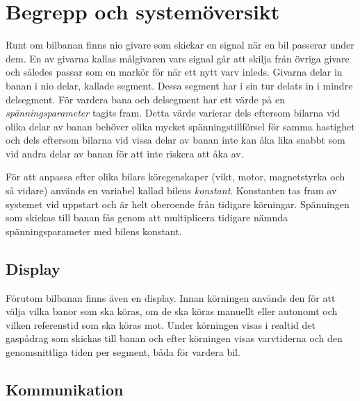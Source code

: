 \section{Begrepp och systemöversikt}
\label{sec:begrepp och systemöversikt}

Runt om bilbanan finns nio givare som skickar en signal när en bil passerar
under dem. En av givarna kallas målgivaren vars signal går att skilja från
övriga givare och således passar som en markör för när ett nytt varv inleds.
Givarna delar in banan i nio delar, kallade segment. Dessa segment har i sin tur
delats in i mindre delsegment. För vardera bana och delsegment har ett värde på
en \emph{spänningsparameter} tagits fram. Detta värde varierar dels eftersom
bilarna vid olika delar av banan behöver olika mycket spänningstillförsel för
samma hastighet och dels eftersom bilarna vid vissa delar av banan inte kan åka
lika snabbt som vid andra delar av banan för att inte riskera att åka av.

För att anpassa efter olika bilars köregenskaper (vikt, motor, magnetstyrka och
så vidare) används en variabel kallad bilens \emph{konstant}. Konstanten tas
fram av systemet vid uppstart och är helt oberoende från tidigare körningar.
Spänningen som skickas till banan fås genom att multiplicera tidigare nämnda
spänningsparameter med bilens konstant.


\subsection{Display}

Förutom bilbanan finns även en display. Innan körningen används den för att
välja vilka banor som ska köras, om de ska köras manuellt eller autonomt och
vilken referenstid som ska köras mot. Under körningen visas i realtid det
gaspådrag som skickas till banan och efter körningen visas varvtiderna och den
genomsnittliga tiden per segment, båda för vardera bil.

\subsection{Kommunikation}

